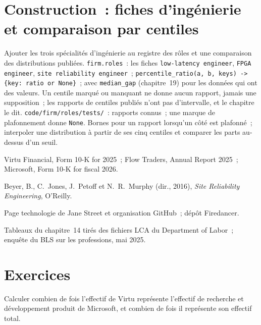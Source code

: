 \section{Construction~: fiches d'ingénierie et comparaison par centiles}\label{bld:in:software-engineer:roles}

\begin{build}
 Ajouter les trois spécialités d'ingénierie au registre des rôles et une comparaison des distributions publiées.
 \texttt{firm.roles}~: les fiches \texttt{low-latency engineer}, \texttt{FPGA engineer},
\texttt{site reliability engineer}~; \texttt{percentile\_ratio(a, b, keys) -> \{key: ratio or None\}}~; avec
\texttt{median\_gap} (chapitre~19) pour les données qui ont des valeurs.
 Un centile marqué ou manquant ne donne aucun rapport, jamais une supposition~; les rapports de centiles publiés
n'ont pas d'intervalle, et le chapitre le dit.
 \texttt{code/firm/roles/tests/}~: rapports connus~; une marque de plafonnement donne \texttt{None}.
 Bornes pour un rapport lorsqu'un côté est plafonné~; interpoler une distribution à partir de ses cinq centiles et
comparer les parts au-dessus d'un seuil.
\end{build}

\begin{omsources}
\item Virtu Financial, Form 10-K for 2025~; Flow Traders, Annual Report 2025~; Microsoft, Form 10-K for fiscal 2026.
\item Beyer, B., C.~Jones, J.~Petoff et N.~R.~Murphy (dir., 2016), \emph{Site Reliability Engineering}, O'Reilly.
\item Page technologie de Jane Street et organisation GitHub~; dépôt Firedancer.
\item Tableaux du chapitre~14 tirés des fichiers LCA du Department of Labor~; enquête du BLS sur les professions, mai 2025.
\end{omsources}

\section{Exercices}

\begin{exercise}[$\star$]\label{exo:in:software-engineer:1}
Calculer combien de fois l'effectif de Virtu représente l'effectif de recherche et développement produit de Microsoft, et combien de fois il représente son effectif total.
\end{exercise}

